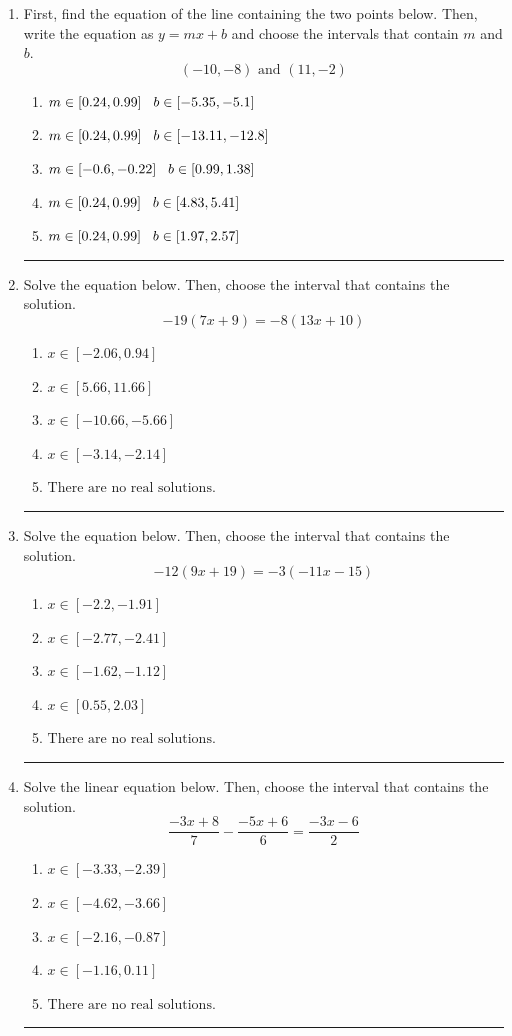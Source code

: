 \documentclass[14pt]{extbook}
\newcommand{\litem}[1]{\item#1\hspace*{-1cm}\rule{\textwidth}{0.4pt}}
\begin{document}
\begin{enumerate}
{\begin{enumerate}[label=\Alph*.]
\end{enumerate} }
\litem{
First, find the equation of the line containing the two points below. Then, write the equation as $ y=mx+b $ and choose the intervals that contain $m$ and $b$.\[ (-10, -8) \text{ and } (11, -2) \]\begin{enumerate}[label=\Alph*.]
\item \( m \in [0.24, 0.99] \hspace*{3mm} b \in [-5.35, -5.1] \)
\item \( m \in [0.24, 0.99] \hspace*{3mm} b \in [-13.11, -12.8] \)
\item \( m \in [-0.6, -0.22] \hspace*{3mm} b \in [0.99, 1.38] \)
\item \( m \in [0.24, 0.99] \hspace*{3mm} b \in [4.83, 5.41] \)
\item \( m \in [0.24, 0.99] \hspace*{3mm} b \in [1.97, 2.57] \)

\end{enumerate} }
\litem{
Solve the equation below. Then, choose the interval that contains the solution.\[ -19(7x + 9) = -8(13x + 10) \]\begin{enumerate}[label=\Alph*.]
\item \( x \in [-2.06, 0.94] \)
\item \( x \in [5.66, 11.66] \)
\item \( x \in [-10.66, -5.66] \)
\item \( x \in [-3.14, -2.14] \)
\item \( \text{There are no real solutions.} \)

\end{enumerate} }
\litem{
Solve the equation below. Then, choose the interval that contains the solution.\[ -12(9x + 19) = -3(-11x -15) \]\begin{enumerate}[label=\Alph*.]
\item \( x \in [-2.2, -1.91] \)
\item \( x \in [-2.77, -2.41] \)
\item \( x \in [-1.62, -1.12] \)
\item \( x \in [0.55, 2.03] \)
\item \( \text{There are no real solutions.} \)

\end{enumerate} }
\litem{
Solve the linear equation below. Then, choose the interval that contains the solution.\[ \frac{-3x + 8}{7} - \frac{-5x + 6}{6} = \frac{-3x -6}{2} \]\begin{enumerate}[label=\Alph*.]
\item \( x \in [-3.33, -2.39] \)
\item \( x \in [-4.62, -3.66] \)
\item \( x \in [-2.16, -0.87] \)
\item \( x \in [-1.16, 0.11] \)
\item \( \text{There are no real solutions.} \)


\end{enumerate}}
\end{enumerate}
\end{document}
